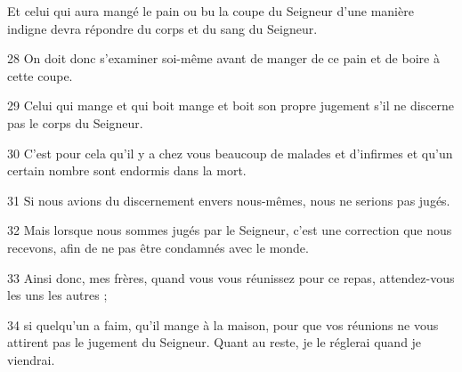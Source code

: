 Et celui qui aura mangé le pain ou bu la coupe du Seigneur d’une manière indigne devra répondre du corps et du sang du Seigneur.

28 On doit donc s’examiner soi-même avant de manger de ce pain et de boire à cette coupe.

29 Celui qui mange et qui boit mange et boit son propre jugement s’il ne discerne pas le corps du Seigneur.

30 C’est pour cela qu’il y a chez vous beaucoup de malades et d’infirmes et qu’un certain nombre sont endormis dans la mort.

31 Si nous avions du discernement envers nous-mêmes, nous ne serions pas jugés.

32 Mais lorsque nous sommes jugés par le Seigneur, c’est une correction que nous recevons, afin de ne pas être condamnés avec le monde.

33 Ainsi donc, mes frères, quand vous vous réunissez pour ce repas, attendez-vous les uns les autres ;

34 si quelqu’un a faim, qu’il mange à la maison, pour que vos réunions ne vous attirent pas le jugement du Seigneur. Quant au reste, je le réglerai quand je viendrai.